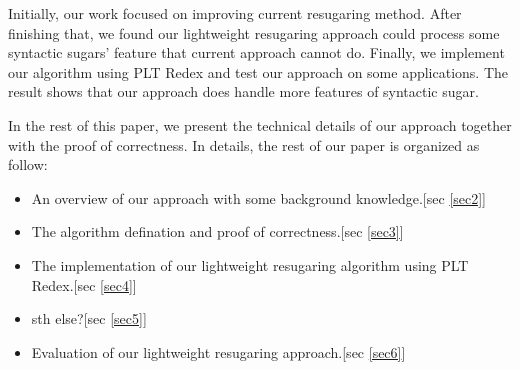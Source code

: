 Initially, our work focused on improving current resugaring method. After finishing that, we found our lightweight resugaring approach could process some syntactic sugars' feature that current approach cannot do. Finally, we implement our algorithm using PLT Redex\cite{SEwPR} and test our approach on some applications. The result shows that our approach does handle more features of syntactic sugar.

In the rest of this paper, we present the technical details of our approach together with the proof of correctness. In details, the rest of our paper is organized as follow:

\begin{itemize}
\item An overview of our approach with some background knowledge.[sec \ref{sec2}]
\item The algorithm defination and proof of correctness.[sec \ref{sec3}]
\item The implementation of our lightweight resugaring algorithm using PLT Redex.[sec \ref{sec4}]
\item sth else?[sec \ref{sec5}]
\item Evaluation of our lightweight resugaring approach.[sec \ref{sec6}]
\end{itemize}
